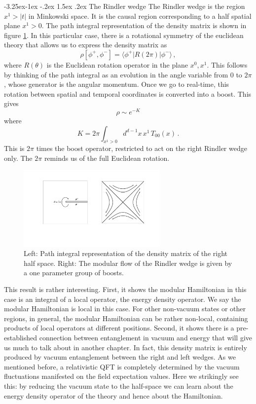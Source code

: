 \documentclass[11pt,a4paper]{article}
\makeatletter
\renewcommand\subsection{\@startsection{subsection}{2}{\z@}%
                                   {-3.25ex\@plus -1ex \@minus -.2ex}%
                                     {1.5ex \@plus .2ex}%
                                     {\normalfont\bfseries}}
\numberwithin{equation}{section}
\newcommand{\be}{\begin{equation}}
\newcommand{\ee}{\end{equation}}
\makeatother
\begin{document}
\subsection{The Rindler wedge}
\label{rw}
The Rindler wedge is the region $x^1>|t|$ in Minkowski space. It is the causal region corresponding to a half spatial plane $x^1>0$. The path integral representation of the density matrix is shown in figure \ref{rindler}. In this particular case, there is a rotational symmetry of the euclidean theory that allows us to express the density matrix as  
\be
\rho[\phi^+,\phi^-]=\langle \phi^+| R(2\pi) |\phi^- \rangle\,,
\ee
where $R(\theta)$ is the Euclidean rotation operator in the plane $x^0,x^1$. 
This follows by thinking of the path integral as an evolution in the angle variable from $0$ to $2\pi$, whose generator is the angular momentum.  
Once we go to real-time, this rotation between spatial and temporal coordinates is converted into a boost. This gives
\be
\rho\sim e^{- K}\label{pico}
\ee
where
\be
K=2 \pi \int_{x^1>0} d^{d-1}x\,  x^1\, T_{00}(x)\,.\label{pico1}
\ee
This is $2 \pi$ times the boost operator, restricted to act on the right Rindler wedge only. The $2\pi$ reminds us of the full Euclidean rotation.  

\begin{figure}[t]
\begin{center}  
\includegraphics[width=0.65\textwidth]{rindler.pdf}
\captionsetup{width=0.9\textwidth}
\caption{Left: Path integral representation of the density matrix of the right half space. Right: The modular flow of the Rindler wedge is given by a one parameter group of boosts.}
\label{rindler}
\end{center}  
\end{figure}

This result is rather interesting. First, it shows the modular Hamiltonian in this case is an integral of a local operator, the energy density operator. We say the modular Hamiltonian is local in this case. For other non-vacuum states or other regions, in general, the modular Hamiltonian can be rather non-local, containing products of local operators at different positions. Second, it shows there is a pre-established connection between entanglement in vacuum and energy that will give us much to talk about in another chapter. In fact, this density matrix is entirely produced by vacuum entanglement between the right and left wedges. As we mentioned before, a relativistic QFT is completely determined by the vacuum fluctuations manifested on the field expectation values. Here we strikingly see this: by reducing the vacuum state to the half-space we can learn about the energy density operator of the theory and hence about the Hamiltonian.      
\end{document}
